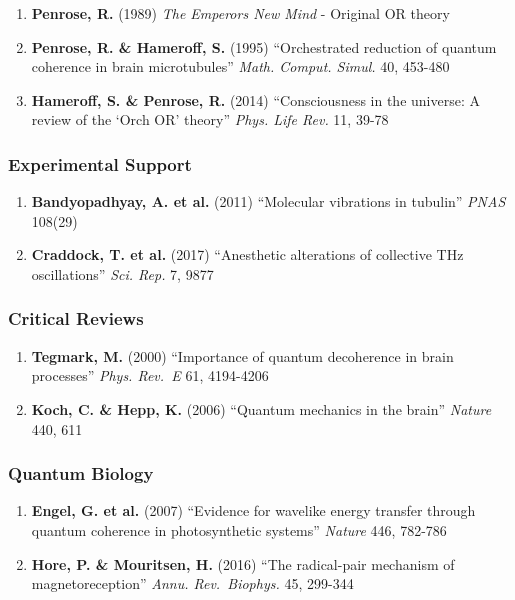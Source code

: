 \begin{enumerate}
\def\labelenumi{\arabic{enumi}.}
\tightlist
\item
  \textbf{Penrose, R.} (1989) \emph{The Emperor\textquotesingle s New
  Mind} - Original OR theory
\item
  \textbf{Penrose, R. \& Hameroff, S.} (1995) ``Orchestrated reduction
  of quantum coherence in brain microtubules'' \emph{Math. Comput.
  Simul.} 40, 453-480
\item
  \textbf{Hameroff, S. \& Penrose, R.} (2014) ``Consciousness in the
  universe: A review of the `Orch OR' theory'' \emph{Phys. Life Rev.}
  11, 39-78
\end{enumerate}

\subsubsection{Experimental Support}\label{experimental-support}

\begin{enumerate}
\def\labelenumi{\arabic{enumi}.}
\setcounter{enumi}{3}
\tightlist
\item
  \textbf{Bandyopadhyay, A. et al.} (2011) ``Molecular vibrations in
  tubulin'' \emph{PNAS} 108(29)
\item
  \textbf{Craddock, T. et al.} (2017) ``Anesthetic alterations of
  collective THz oscillations'' \emph{Sci. Rep.} 7, 9877
\end{enumerate}

\subsubsection{Critical Reviews}\label{critical-reviews}

\begin{enumerate}
\def\labelenumi{\arabic{enumi}.}
\setcounter{enumi}{5}
\tightlist
\item
  \textbf{Tegmark, M.} (2000) ``Importance of quantum decoherence in
  brain processes'' \emph{Phys. Rev.~E} 61, 4194-4206
\item
  \textbf{Koch, C. \& Hepp, K.} (2006) ``Quantum mechanics in the
  brain'' \emph{Nature} 440, 611
\end{enumerate}

\subsubsection{Quantum Biology}\label{quantum-biology}

\begin{enumerate}
\def\labelenumi{\arabic{enumi}.}
\setcounter{enumi}{7}
\tightlist
\item
  \textbf{Engel, G. et al.} (2007) ``Evidence for wavelike energy
  transfer through quantum coherence in photosynthetic systems''
  \emph{Nature} 446, 782-786
\item
  \textbf{Hore, P. \& Mouritsen, H.} (2016) ``The radical-pair mechanism
  of magnetoreception'' \emph{Annu. Rev.~Biophys.} 45, 299-344
\end{enumerate}
